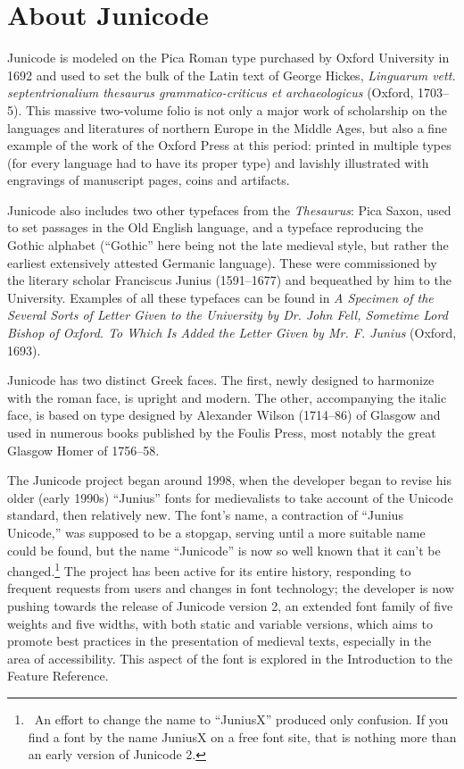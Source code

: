
\hypertarget{aboutj}{}\chapter{About Junicode}

{\large%
\noindent Junicode is modeled on the Pica Roman type
purchased by Oxford University in 1692 and
used to set the bulk of the Latin text of George Hickes,
{\itshape Linguarum vett. septentrionalium thesaurus
grammatico-criticus et archaeologicus} (Oxford, 1703–5). This massive two-volume folio
is not only a major work of scholarship on the languages and literatures
of northern Europe in the Middle Ages, but also a fine
example of the work of the Oxford Press at this
period: printed in multiple types (for every language had to
have its proper type) and lavishly
illustrated with engravings of manuscript pages, coins and
artifacts.

Junicode also includes two other typefaces from the \textit{Thesaurus}:
Pica Saxon, used to set passages in the Old English language,
and a typeface reproducing the Gothic alphabet (“Gothic” here
being not the late medieval style, but rather
the earliest extensively attested Germanic language).
These were commissioned by the literary scholar
Francis\-cus Junius (1591–1677) and bequeathed by him to
the University. Examples of all these typefaces can be found
in {\itshape A Specimen of the
Several Sorts of Letter Given to the University by Dr. John Fell,
Sometime Lord Bishop of Oxford. To Which Is Added the Letter Given by
Mr. F. Junius} (Oxford, 1693).

Junicode has two distinct Greek faces. The first, newly designed to harmonize with the roman face, is
up\-right and modern. The other, accompanying the italic face, is based on type designed by Alexander
Wilson (1714–86) of Glasgow and used in numerous books published by
the Foulis Press, most notably the great Glasgow Homer of 1756–58.

The Junicode project began around 1998, when the developer began to revise his
older (early 1990s) “Junius” fonts for medievalists to take account of the Unicode
standard, then relatively new. The font’s name, a contraction of
“Junius Unicode,” was supposed to be a stopgap, serving until a more suitable name
could be found, but the name “Junicode” is now so well known that it can’t be
changed.\footnote{\ An effort to change the name to “JuniusX” produced
only confusion. If you find a font by the name JuniusX on a free font site,
that is nothing more than an early version of Junicode 2.}
The project has been active for its entire history, responding to frequent
requests from users and changes in font technology; the developer is now pushing
towards the release of Junicode version 2, an extended font family of five weights
and five widths, with both static and variable versions, which aims to
promote best practices in the presentation of medieval texts, especially in
the area of accessibility. This aspect of the font is explored in the
Introduction to the Feature Reference.

}
